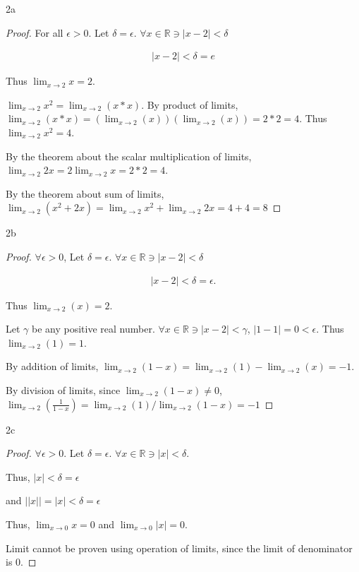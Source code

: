 \documentclass{article}
\newcommand{\R}{\mathbb{R}}
\newcommand{\abs}[1]{\left\lvert #1\right\rvert}
\begin{document}
\bigskip

\begin{PROB}{2a}\label{Problem 2a.}
\end{PROB}
\begin{proof}
    For all $\epsilon > 0$. Let $\delta = \epsilon$. $\forall x \in \R \ni \abs{x - 2} < \delta$  

    \begin{align*}
        \abs{x - 2} < \delta = e
    \end{align*}

    Thus $\lim_{x \to 2} x = 2$. 
    
    $\lim_{x \to 2} x^2 = \lim_{x \to 2} (x * x)$. By product of limits, $\lim_{x \to 2}(x * x) = \left(\lim_{x\to2}(x) \right) \left(\lim_{x\to2}(x)\right) = 2 * 2 = 4$. Thus $\lim_{x \to 2}x^2 = 4$. 
    
    By the theorem about the scalar multiplication of limits, $\lim_{x \to 2} 2x = 2\lim_{x \to 2} x = 2 * 2 = 4$. 
    
    By the theorem about sum of limits, $\lim_{x \to 2} \left(x^2 + 2x\right) = \lim_{x \to 2} x^2 +\lim_{x \to 2} 2x = 4 + 4 = 8$  
\end{proof}
\begin{PROB}{2b}\label{Problem 2b.}
\end{PROB}
\begin{proof}
    $\forall \epsilon > 0$, Let $\delta = \epsilon$. $\forall x \in \R \ni \abs{x - 2} < \delta$  
    
    \begin{align*}
        \abs{x - 2} < \delta = \epsilon. 
    \end{align*} 

    Thus $\lim_{x \to 2}(x) = 2$.

    Let $\gamma$ be any positive real number. $\forall x \in \R \ni \abs{x - 2} < \gamma$, $\abs{1 - 1} = 0 < \epsilon$. Thus $\lim_{x \to 2}(1) = 1$.
    
    By addition of limits, $\lim_{x \to 2}(1 -x) = \lim_{x \to 2}(1) - \lim_{x \to 2}(x) = -1$. 
    
    By division of limits, since $\lim_{x \to 2}(1 - x)\neq 0$, $\lim_{x\to 2}(\frac{1}{1 - x}) = \lim_{x\to 2}(1) / \lim_{x \to 2}(1 -x) =-1$  
\end{proof}
\begin{PROB}{2c}\label{Problem 2c.}
\end{PROB}
\begin{proof}
    $\forall \epsilon > 0$. Let $\delta = \epsilon$. $\forall x \in \R \ni \abs{x} < \delta$.   
    
    Thus, 
    $\abs{x} < \delta = \epsilon$ 

    and
    $\abs{\abs{x}} = \abs{x} < \delta = \epsilon$
    
    Thus, $\lim_{x \to 0}x = 0$ and $\lim_{x \to 0} \abs{x} = 0$. 
    
    Limit cannot be proven using operation of limits, since the limit of denominator is 0.  
\end{proof}
\end{document}

